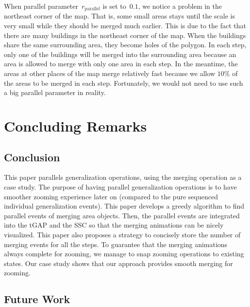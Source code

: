 \documentclass[ijgi,article,submit,moreauthors,pdftex]{Definitions/mdpi}
\begin{document}
When parallel parameter~$r_\mathrm{parallel}$ is set to~$0.1$,
we notice a problem in the northeast corner of the map.
That is, some small areas stays until the scale is very small
while they should be merged much earlier.
This is due to the fact that 
there are many buildings in the northeast corner of the map.
When the buildings share the same surrounding area,
they become holes of the polygon.
In each step, only one of the buildings will be merged into the surrounding area
because an area is allowed to merge with only one area in each step.
In the meantime, the areas at other places of the map merge relatively fast
because we allow $10\%$ of the areas to be merged in each step.
Fortunately, we would not need to use such a big parallel parameter in reality.








\section{Concluding Remarks}
\label{sec:concluding_remarks}

\subsection{Conclusion}
This paper parallels generalization operations,
using the merging operation as a case study. 
The purpose of having parallel generalization operations 
is to have smoother zooming experience later on 
(compared to the pure sequenced individual generalization events).
This paper develops a greedy algorithm to find parallel events of 
merging area objects.
Then, the parallel events are integrated into 
the tGAP and the SSC so that the merging animations can be nicely visualized.
This paper also proposes a strategy 
to concisely store the number of merging events for all the steps.
To guarantee that the merging animations always complete for zooming, 
we manage to snap zooming operations to existing states.
Our case study shows that 
our approach provides smooth merging for zooming.


\subsection{Future Work}
\end{document}
